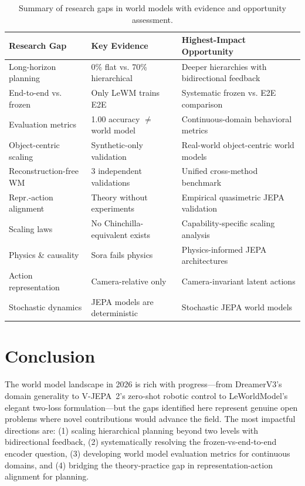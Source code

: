 \documentclass[11pt,a4paper]{article}
\begin{document}
\begin{table}[h]
\centering
\small
\caption{Summary of research gaps in world models with evidence and opportunity assessment.}
\label{tab:gaps}
\begin{tabular}{@{}p{3.5cm}p{4cm}p{4.5cm}@{}}
\toprule
\textbf{Research Gap} & \textbf{Key Evidence} & \textbf{Highest-Impact Opportunity} \\
\midrule
Long-horizon planning & 0\% flat vs. 70\% hierarchical \citep{zhang2026hierarchical} & Deeper hierarchies with bidirectional feedback \\
End-to-end vs. frozen & Only LeWM trains E2E \citep{maes2026leworldmodel} & Systematic frozen vs. E2E comparison \\
Evaluation metrics & 1.00 accuracy $\neq$ world model \citep{vafa2024evaluating} & Continuous-domain behavioral metrics \\
Object-centric scaling & Synthetic-only validation \citep{nam2026causaljepa} & Real-world object-centric world models \\
Reconstruction-free WM & 3 independent validations & Unified cross-method benchmark \\
Repr.-action alignment & Theory without experiments \citep{kobanda2026intrinsic} & Empirical quasimetric JEPA validation \\
Scaling laws & No Chinchilla-equivalent exists & Capability-specific scaling analysis \\
Physics \& causality & Sora fails physics \citep{ding2024understanding} & Physics-informed JEPA architectures \\
Action representation & Camera-relative only \citep{garrido2026learning} & Camera-invariant latent actions \\
Stochastic dynamics & JEPA models are deterministic & Stochastic JEPA world models \\
\bottomrule
\end{tabular}
\end{table}

\section{Conclusion}

The world model landscape in 2026 is rich with progress---from DreamerV3's domain generality to V-JEPA~2's zero-shot robotic control to LeWorldModel's elegant two-loss formulation---but the gaps identified here represent genuine open problems where novel contributions would advance the field. The most impactful directions are: (1) scaling hierarchical planning beyond two levels with bidirectional feedback, (2) systematically resolving the frozen-vs-end-to-end encoder question, (3) developing world model evaluation metrics for continuous domains, and (4) bridging the theory-practice gap in representation-action alignment for planning.


\end{document}
